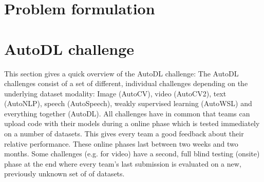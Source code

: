\documentclass{article}
\begin{document}
\section{Problem formulation}
\label{sec:problem}



\section{AutoDL challenge}
\label{sec:autodl}
This section gives a quick overview of the AutoDL challenge: The AutoDL challenges consist of a set of different, individual challenges depending on the underlying dataset modality: Image (AutoCV), video (AutoCV2), text (AutoNLP), speech (AutoSpeech), weakly supervised learning (AutoWSL) and everything together (AutoDL). 
All challenges have in common that teams can upload code with their models during a online phase which is tested immediately on a number of datasets. This gives every team a good feedback about their relative performance. These online phases last between two weeks and two months. Some challenges (e.g. for video) have a second, full blind testing (onsite) phase at the end where every team's last submission is evaluated on a new, previously unknown set of of datasets. 
\end{document}

